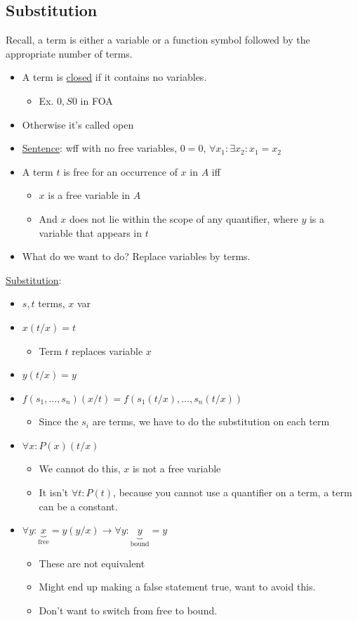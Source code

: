 \documentclass[11pt]{article}
\begin{document}
\subsection{Substitution}
\label{sec:org309600e}
Recall, a term is either a variable or a function symbol followed by the appropriate number of terms. 
\begin{itemize}
\item A term is \uline{closed} if it contains no variables.
\begin{itemize}
\item Ex. \(0, S0\) in FOA
\end{itemize}
\item Otherwise it's called open
\item \uline{Sentence}: wff with no free variables, \(0=0\), \(\forall x_1:\exists x_2: x_1=x_2\)
\item A term \uline{\(t\)} is free for an occurrence of \uline{\(x\)} in \uline{\(A\)} iff
\begin{itemize}
\item \(x\) is a free variable in \(A\)
\item And \(x\) does not lie within the scope of any quantifier, where \(y\) is a variable that appears in \(t\)
\end{itemize}
\item What do we want to do? Replace variables by terms.
\end{itemize}
\uline{Substitution}:
\begin{itemize}
\item \(s,t\) terms, \(x\) var
\item \(x(t/x) = t\)
\begin{itemize}
\item Term \(t\) replaces variable \(x\)
\end{itemize}
\item \(y(t/x) = y\)
\item \(f(s_1,\ldots,s_n)(x/t) = f(s_1(t/x),\ldots,s_n(t/x))\)
\begin{itemize}
\item Since the \(s_i\) are terms, we have to do the substitution on each term
\end{itemize}
\item \(\forall x: P(x) (t/x)\)
\begin{itemize}
\item We cannot do this, \(x\) is not a free variable
\item It isn't \(\forall t : P(t)\), because you cannot use a quantifier on a term, a term can be a constant.
\end{itemize}
\item \(\forall y : \underbrace{x}_{\text{free}}=y (y/x) \rightarrow \forall y: \underbrace{y}_{\text{bound}}=y\)
\begin{itemize}
\item These are not equivalent
\item Might end up making a false statement true, want to avoid this.
\item Don't want to switch from free to bound.
\end{itemize}
\end{itemize}
\end{document}
